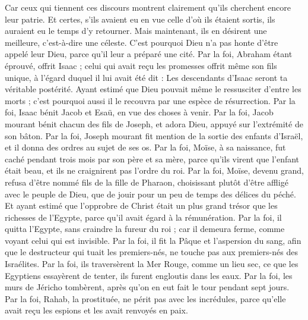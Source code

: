 \begin{multicols}{2}
Car ceux qui tiennent ces discours montrent clairement qu'ils cherchent encore leur patrie.
Et certes, s'ils avaient eu en vue celle d'où ils étaient sortis, ils auraient eu le temps d'y retourner.
Mais maintenant, ils en désirent une meilleure, c'est-à-dire une céleste. C'est pourquoi Dieu n'a pas honte d'être appelé leur Dieu, parce qu'il leur a préparé une cité.
Par la foi, Abraham étant éprouvé, offrit Isaac ; celui qui avait reçu les promesses offrit même son fils unique,
à l'égard duquel il lui avait été dit : Les descendants d'Isaac seront ta véritable postérité.
Ayant estimé que Dieu pouvait même le ressusciter d'entre les morts ; c'est pourquoi aussi il le recouvra par une espèce de résurrection.
Par la foi, Isaac bénit Jacob et Esaü, en vue des choses à venir.
Par la foi, Jacob mourant bénit chacun des fils de Joseph, et adora Dieu, appuyé sur l'extrémité de son bâton.
Par la foi, Joseph mourant fit mention de la sortie des enfants d'Israël, et il donna des ordres au sujet de ses os.
Par la foi, Moïse, à sa naissance, fut caché pendant trois mois par son père et sa mère, parce qu'ils virent que l'enfant était beau, et ils ne craignirent pas l'ordre du roi.
Par la foi, Moïse, devenu grand, refusa d'être nommé fils de la fille de Pharaon,
choisissant plutôt d'être affligé avec le peuple de Dieu, que de jouir pour un peu de temps des délices du péché.
Et ayant estimé que l'opprobre de Christ était un plus grand trésor que les richesses de l'Egypte, parce qu'il avait égard à la rémunération.
Par la foi, il quitta l'Egypte, sans craindre la fureur du roi ; car il demeura ferme, comme voyant celui qui est invisible.
Par la foi, il fit la Pâque et l'aspersion du sang, afin que le destructeur qui tuait les premiers-nés, ne touche pas aux premiers-nés des Israélites.
Par la foi, ils traversèrent la Mer Rouge, comme un lieu sec, ce que les Egyptiens essayèrent de tenter, ils furent engloutis dans les eaux.
Par la foi, les murs de Jéricho tombèrent, après qu'on en eut fait le tour pendant sept jours.
Par la foi, Rahab, la prostituée, ne périt pas avec les incrédules, parce qu'elle avait reçu les espions et les avait renvoyés en paix.

\end{multicols}
